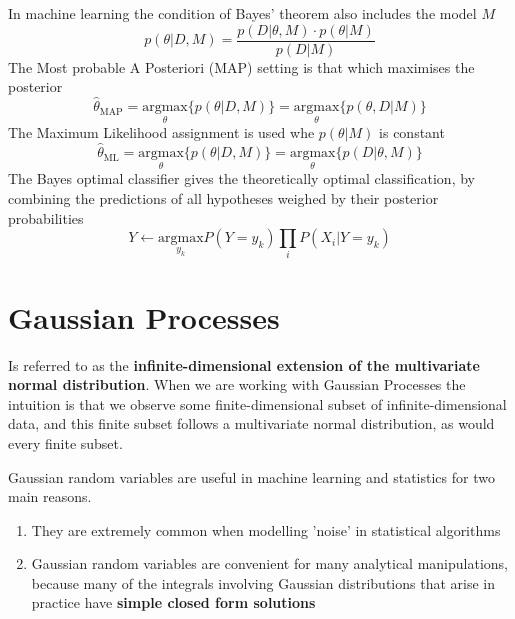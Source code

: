 \documentclass[11pt]{article}
\theoremstyle{definition}
\newcommand*\argmax[1]{\underset{#1}{\text{argmax}}}
\begin{document}
In machine learning the condition of Bayes' theorem also includes the model $M$
\begin{equation*}
	p(\theta|D,M) = \frac{p(D | \theta, M) \cdot p(\theta | M)}{p(D|M)}
\end{equation*}
The Most probable A Posteriori (MAP) setting is that which maximises the posterior
\begin{equation*}
	\hat{\theta}_{\text{MAP}} = \argmax{\theta}\{p(\theta|D,M)\} = \argmax{\theta}\{p(\theta,D|M)\}
\end{equation*}
The Maximum Likelihood assignment is used whe $p(\theta|M)$ is constant
\begin{equation*}
	\hat{\theta}_{\text{ML}} = \argmax{\theta} \{p(\theta|D,M)\} = \argmax{\theta}\{p(D|\theta,M)\}
\end{equation*}
The Bayes optimal classifier gives the theoretically optimal classification, by combining the predictions of all hypotheses weighed by their posterior probabilities
\begin{equation*}
	Y \leftarrow \argmax{y_k} P(Y=y_k) \prod_{i} P(X_i | Y=y_k)
\end{equation*}

\section{Gaussian Processes}
Is referred to as the \textbf{infinite-dimensional extension of the multivariate normal distribution}. When we are working with Gaussian Processes the intuition is that we observe some finite-dimensional subset of infinite-dimensional data, and this finite subset follows a multivariate normal distribution, as would every finite subset.

Gaussian random variables are useful in machine learning and statistics for two main reasons.
\begin{enumerate}
	\item They are extremely common when modelling 'noise' in statistical algorithms
	\item Gaussian random variables are convenient for many analytical manipulations, because many of the integrals involving Gaussian distributions that arise in practice have \textbf{simple closed form solutions}
\end{enumerate}
\end{document}
